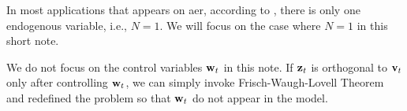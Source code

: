 \documentclass[a4paper]{article}
\begin{document}

\begin{remark}
	In most applications that appears on \gls*{aer},
	according to \textcite{andrews-stock-sun-2019},
	there is only one endogenous variable, i.e., $N=1$.
	We will focus on the case where $N=1$ in this short note.
\end{remark}

\begin{remark}
	We do not focus on the control variables $\mathbf{w}_t$ in this note.
	If $\mathbf{z}_t$ is orthogonal to $\mathbf{v}_t$ only after controlling $\mathbf{w}_t$,
	we can simply invoke Frisch-Waugh-Lovell Theorem
	and redefined the problem so that $\mathbf{w}_t$ do not appear in the model.
\end{remark}
\end{document}
